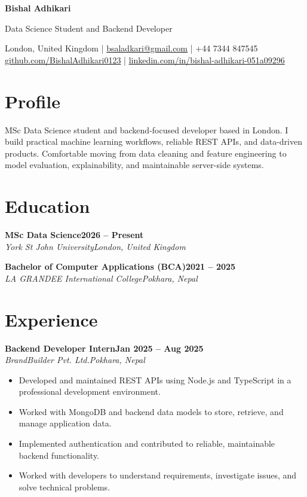 \documentclass[10pt,a4paper]{article}
\newcommand{\entry}[4]{%
  \textbf{#1}\hfill\textbf{#2}\\
  \textit{#3}\hfill\textit{#4}\par
}
\begin{document}
{\LARGE\bfseries Bishal Adhikari}\par
\vspace{3pt}
{\large Data Science Student and Backend Developer}\par
\vspace{5pt}
London, United Kingdom \quad | \quad
\href{mailto:bsaladkari@gmail.com}{bsaladkari@gmail.com} \quad | \quad
+44 7344 847545\\
\href{https://github.com/BishalAdhikari0123}{github.com/BishalAdhikari0123} \quad | \quad
\href{https://www.linkedin.com/in/bishal-adhikari-051a09296/}{linkedin.com/in/bishal-adhikari-051a09296}

\section*{Profile}
MSc Data Science student and backend-focused developer based in London. I build practical machine learning workflows, reliable REST APIs, and data-driven products. Comfortable moving from data cleaning and feature engineering to model evaluation, explainability, and maintainable server-side systems.

\section*{Education}
\entry{MSc Data Science}{2026 -- Present}{York St John University}{London, United Kingdom}
\entry{Bachelor of Computer Applications (BCA)}{2021 -- 2025}{LA GRANDEE International College}{Pokhara, Nepal}

\section*{Experience}
\entry{Backend Developer Intern}{Jan 2025 -- Aug 2025}{BrandBuilder Pvt. Ltd.}{Pokhara, Nepal}
\begin{itemize}
  \item Developed and maintained REST APIs using Node.js and TypeScript in a professional development environment.
  \item Worked with MongoDB and backend data models to store, retrieve, and manage application data.
  \item Implemented authentication and contributed to reliable, maintainable backend functionality.
  \item Worked with developers to understand requirements, investigate issues, and solve technical problems.
\end{itemize}
\end{document}
